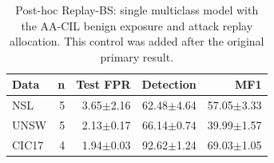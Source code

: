 \begin{table}[t]
\centering\scriptsize
\setlength{\tabcolsep}{3.8pt}
\caption{Post-hoc Replay-BS: single multiclass model with the AA-CIL benign exposure and attack replay allocation. This control was added after the original primary result.}\label{tab:replay-bs}
\begin{tabular}{lrrrr}
\toprule
Data & n & Test FPR & Detection & MF1 \\
\midrule
NSL & 5 & 3.65$\pm$2.16 & 62.48$\pm$4.64 & 57.05$\pm$3.33 \\
UNSW & 5 & 2.13$\pm$0.17 & 66.14$\pm$0.74 & 39.99$\pm$1.57 \\
CIC17 & 4 & 1.94$\pm$0.03 & 92.62$\pm$1.24 & 69.03$\pm$1.05 \\
\bottomrule
\end{tabular}
\end{table}
